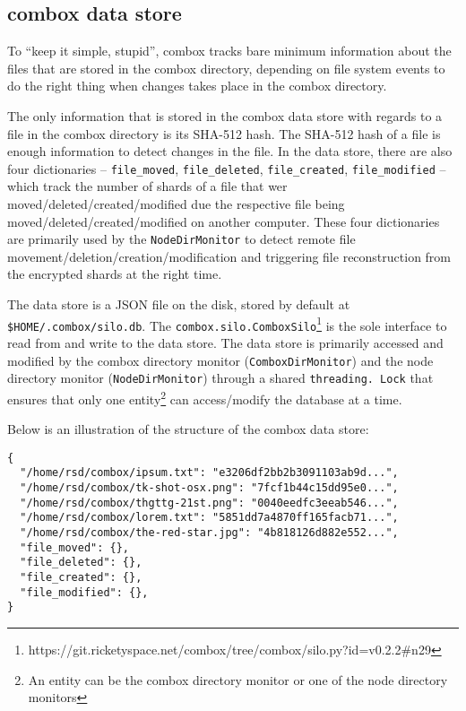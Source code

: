 \subsection{combox data store}\label{sec:3-combox-db}

To ``keep it simple, stupid'', combox tracks bare minimum information
about the files that are stored in the combox directory, depending on file
system events to do the right thing when changes takes place in the
combox directory.

The only information that is stored in the combox data store with regards to a 
file in the combox directory is its SHA-512 hash. The SHA-512 hash of
a file is enough information to detect changes in the file. In the
data store, there are also four dictionaries -- \verb+file_moved+,
\verb+file_deleted+, \verb+file_created+, \verb+file_modified+ --
which track the number of shards of a file that wer
moved/deleted/created/modified due the respective file being
moved/deleted/created/modified on another computer. These four
dictionaries are primarily used by the \verb+NodeDirMonitor+ to detect
remote file movement/deletion/creation/modification and triggering
file reconstruction from the encrypted shards at the right time.

The data store is a JSON file on the disk, stored by default at \\
\verb+$HOME/.combox/silo.db+. The
\verb+combox.silo.ComboxSilo+\footnote{https://git.ricketyspace.net/combox/tree/combox/silo.py?id=v0.2.2\#n29}
is the sole interface to read from and write to the data store. The
data store is primarily accessed and modified by the combox directory
monitor (\verb+ComboxDirMonitor+) and the node directory monitor
(\verb+NodeDirMonitor+) through a shared \verb+threading. Lock+ that ensures that only
one entity\footnote{An entity can be the combox directory monitor or
  one of the node directory monitors} can access/modify the database
at a time.

Below is an illustration of the structure of the combox data store:

\begin{verbatim}
{
  "/home/rsd/combox/ipsum.txt": "e3206df2bb2b3091103ab9d...",
  "/home/rsd/combox/tk-shot-osx.png": "7fcf1b44c15dd95e0...",
  "/home/rsd/combox/thgttg-21st.png": "0040eedfc3eeab546...",
  "/home/rsd/combox/lorem.txt": "5851dd7a4870ff165facb71...",
  "/home/rsd/combox/the-red-star.jpg": "4b818126d882e552...",
  "file_moved": {},
  "file_deleted": {},
  "file_created": {},
  "file_modified": {},
}
\end{verbatim}

